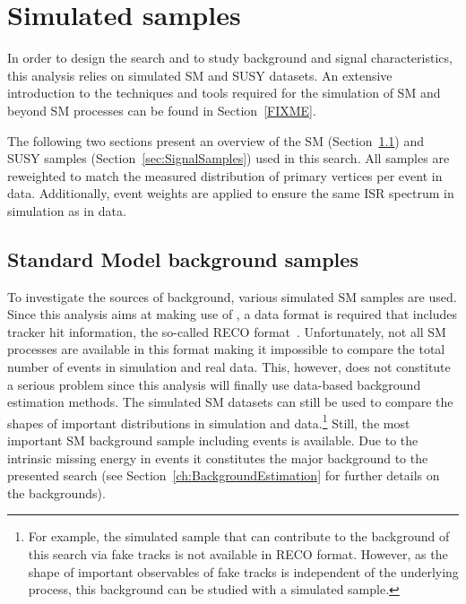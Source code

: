 
\FloatBarrier
\chapter{Simulated samples}
\label{ch:SimulatedSamples}

In order to design the search and to study background and signal characteristics, this analysis relies on simulated  SM and SUSY datasets.
An extensive introduction to the techniques and tools required for the simulation of SM and beyond SM processes can be found in Section~\ref{FIXME}.

The following two sections present an overview of the SM (Section~\ref{sec:SMSamples}) and SUSY samples (Section~\ref{sec:SignalSamples}) used in this search.
All samples are reweighted to match the measured distribution of primary vertices per event in data.
Additionally, event weights are applied to ensure the same ISR spectrum in simulation as in data.

\section{Standard Model background samples}
\label{sec:SMSamples}
To investigate the sources of background, various simulated SM samples are used.
Since this analysis aims at making use of \dedx, a data format is required that includes tracker hit information, the so-called RECO format~\cite{bib:DataFormats}.
Unfortunately, not all SM processes are available in this format making it impossible to compare the total number of events in simulation and real data.
This, however, does not constitute a serious problem since this analysis will finally use data-based background estimation methods.
The simulated SM datasets can still be used to compare the shapes of important distributions in simulation and data.\footnote{For example, the simulated \ZInvJets sample that can contribute to the background of this search via fake tracks is not available in RECO format. However, as the shape of important observables of fake tracks is independent of the underlying process, this background can be studied with a simulated \WJets sample.}
Still, the most important SM background sample including \WJets events is available.
Due to the intrinsic missing energy in \WJets events it constitutes the major background to the presented search (see Section~\ref{ch:BackgroundEstimation} for further details on the backgrounds). \\


